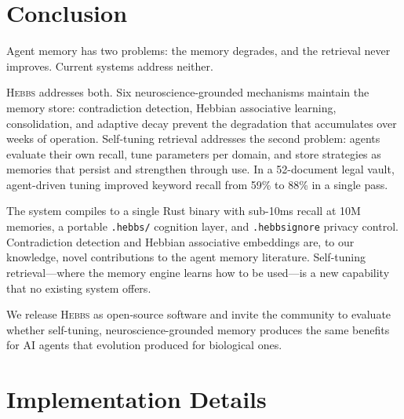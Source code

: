 \documentclass{article}
\begin{document}
\section{Conclusion}

Agent memory has two problems: the memory degrades, and the retrieval never improves. Current systems address neither.

\textsc{Hebbs} addresses both. Six neuroscience-grounded mechanisms maintain the memory store: contradiction detection, Hebbian associative learning, consolidation, and adaptive decay prevent the degradation that accumulates over weeks of operation. Self-tuning retrieval addresses the second problem: agents evaluate their own recall, tune parameters per domain, and store strategies as memories that persist and strengthen through use. In a 52-document legal vault, agent-driven tuning improved keyword recall from 59\% to 88\% in a single pass.

The system compiles to a single Rust binary with sub-10ms recall at 10M memories, a portable \texttt{.hebbs/} cognition layer, and \texttt{.hebbsignore} privacy control. Contradiction detection and Hebbian associative embeddings are, to our knowledge, novel contributions to the agent memory literature. Self-tuning retrieval---where the memory engine learns how to be used---is a new capability that no existing system offers.

We release \textsc{Hebbs} as open-source software and invite the community to evaluate whether self-tuning, neuroscience-grounded memory produces the same benefits for AI agents that evolution produced for biological ones.




\appendix

\section{Implementation Details}
\label{app:implementation}
\end{document}
